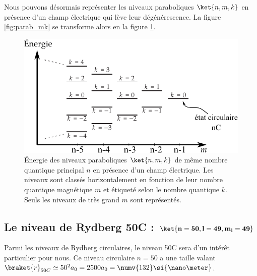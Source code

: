 Nous pouvons désormais représenter les niveaux paraboliques $\ket{n,m,k}$ en présence d'un champ électrique qui lève leur dégénérescence.
La figure \ref{fig:parab_mk} se transforme alors en la figure \ref{fig:Stark_nmk}.
%
\begin{figure}[!h]
\centering
\includegraphics[width=.8\linewidth]{figures/theory/Stark_nmk}
\caption[Échelle des niveaux paraboliques $\ket{n,m,k}$]{
Énergie des niveaux paraboliques $\ket{n,m,k}$ de même nombre quantique principal $n$ en présence d'un champ électrique.
Les niveaux sont classés horizontalement en fonction de leur nombre quantique magnétique $m$ et étiqueté selon le nombre quantique $k$.
Seuls les niveaux de très grand $m$ sont représentés.
}
\label{fig:Stark_nmk}
\end{figure}
%

\subsection{Le niveau de Rydberg 50C : $\mathbf{\ket{n=50,l=49,m_l=49}}$}

\noindent Parmi les niveaux de Rydberg circulaires, le niveau 50C sera d'un intérêt particulier pour nous.
Ce niveau circulaire $n=50$ a une taille valant $\braket{r}_{50C} \simeq 50^2 a_0 = 2500 a_0 = \numv{132}\si{\nano\meter}$.
	

